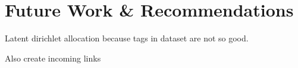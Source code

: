 \section{Future Work \& Recommendations}
Latent dirichlet allocation because tags in dataset are not so good.

Also create incoming links